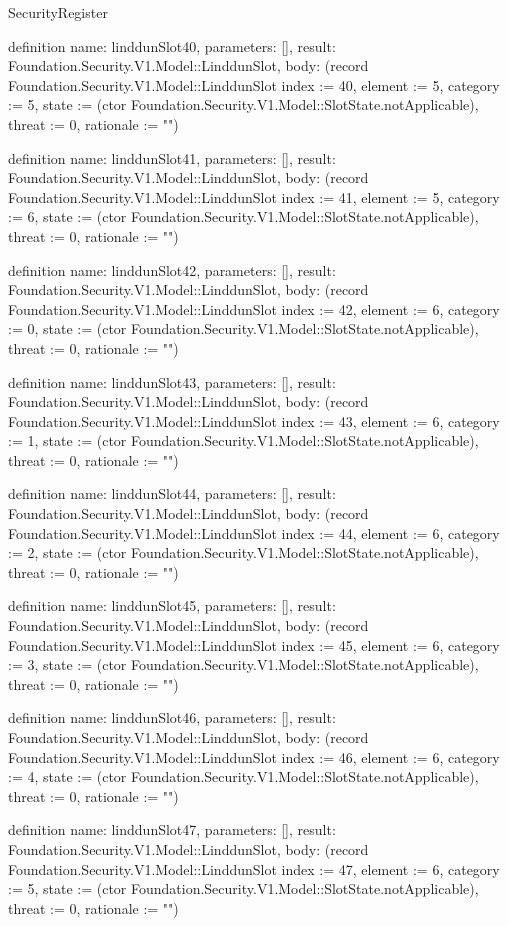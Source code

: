 \begin{lexlean}{SecurityRegister}
\begin{semanticmodule}
definition{
  name: linddunSlot40,
  parameters: [],
  result: Foundation.Security.V1.Model::LinddunSlot,
  body: (record Foundation.Security.V1.Model::LinddunSlot {index := 40, element := 5, category := 5, state := (ctor Foundation.Security.V1.Model::SlotState.notApplicable), threat := 0, rationale := ""})
}

definition{
  name: linddunSlot41,
  parameters: [],
  result: Foundation.Security.V1.Model::LinddunSlot,
  body: (record Foundation.Security.V1.Model::LinddunSlot {index := 41, element := 5, category := 6, state := (ctor Foundation.Security.V1.Model::SlotState.notApplicable), threat := 0, rationale := ""})
}

definition{
  name: linddunSlot42,
  parameters: [],
  result: Foundation.Security.V1.Model::LinddunSlot,
  body: (record Foundation.Security.V1.Model::LinddunSlot {index := 42, element := 6, category := 0, state := (ctor Foundation.Security.V1.Model::SlotState.notApplicable), threat := 0, rationale := ""})
}

definition{
  name: linddunSlot43,
  parameters: [],
  result: Foundation.Security.V1.Model::LinddunSlot,
  body: (record Foundation.Security.V1.Model::LinddunSlot {index := 43, element := 6, category := 1, state := (ctor Foundation.Security.V1.Model::SlotState.notApplicable), threat := 0, rationale := ""})
}

definition{
  name: linddunSlot44,
  parameters: [],
  result: Foundation.Security.V1.Model::LinddunSlot,
  body: (record Foundation.Security.V1.Model::LinddunSlot {index := 44, element := 6, category := 2, state := (ctor Foundation.Security.V1.Model::SlotState.notApplicable), threat := 0, rationale := ""})
}

definition{
  name: linddunSlot45,
  parameters: [],
  result: Foundation.Security.V1.Model::LinddunSlot,
  body: (record Foundation.Security.V1.Model::LinddunSlot {index := 45, element := 6, category := 3, state := (ctor Foundation.Security.V1.Model::SlotState.notApplicable), threat := 0, rationale := ""})
}

definition{
  name: linddunSlot46,
  parameters: [],
  result: Foundation.Security.V1.Model::LinddunSlot,
  body: (record Foundation.Security.V1.Model::LinddunSlot {index := 46, element := 6, category := 4, state := (ctor Foundation.Security.V1.Model::SlotState.notApplicable), threat := 0, rationale := ""})
}

definition{
  name: linddunSlot47,
  parameters: [],
  result: Foundation.Security.V1.Model::LinddunSlot,
  body: (record Foundation.Security.V1.Model::LinddunSlot {index := 47, element := 6, category := 5, state := (ctor Foundation.Security.V1.Model::SlotState.notApplicable), threat := 0, rationale := ""})
}


\end{semanticmodule}
\end{lexlean}
